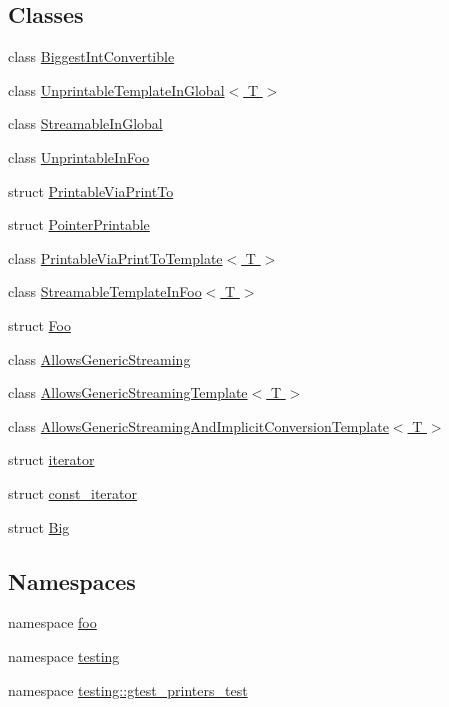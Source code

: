 \subsection*{\-Classes}
\begin{DoxyCompactItemize}
\item 
class \hyperlink{classBiggestIntConvertible}{\-Biggest\-Int\-Convertible}
\item 
class \hyperlink{classUnprintableTemplateInGlobal}{\-Unprintable\-Template\-In\-Global$<$ T $>$}
\item 
class \hyperlink{classStreamableInGlobal}{\-Streamable\-In\-Global}
\item 
class \hyperlink{classfoo_1_1UnprintableInFoo}{\-Unprintable\-In\-Foo}
\item 
struct \hyperlink{structfoo_1_1PrintableViaPrintTo}{\-Printable\-Via\-Print\-To}
\item 
struct \hyperlink{structfoo_1_1PointerPrintable}{\-Pointer\-Printable}
\item 
class \hyperlink{classfoo_1_1PrintableViaPrintToTemplate}{\-Printable\-Via\-Print\-To\-Template$<$ T $>$}
\item 
class \hyperlink{classfoo_1_1StreamableTemplateInFoo}{\-Streamable\-Template\-In\-Foo$<$ T $>$}
\item 
struct \hyperlink{structtesting_1_1gtest__printers__test_1_1Foo}{\-Foo}
\item 
class \hyperlink{classtesting_1_1gtest__printers__test_1_1AllowsGenericStreaming}{\-Allows\-Generic\-Streaming}
\item 
class \hyperlink{classtesting_1_1gtest__printers__test_1_1AllowsGenericStreamingTemplate}{\-Allows\-Generic\-Streaming\-Template$<$ T $>$}
\item 
class \hyperlink{classtesting_1_1gtest__printers__test_1_1AllowsGenericStreamingAndImplicitConversionTemplate}{\-Allows\-Generic\-Streaming\-And\-Implicit\-Conversion\-Template$<$ T $>$}
\item 
struct \hyperlink{structtesting_1_1gtest__printers__test_1_1iterator}{iterator}
\item 
struct \hyperlink{structtesting_1_1gtest__printers__test_1_1const__iterator}{const\-\_\-iterator}
\item 
struct \hyperlink{structtesting_1_1gtest__printers__test_1_1Big}{\-Big}
\end{DoxyCompactItemize}
\subsection*{\-Namespaces}
\begin{DoxyCompactItemize}
\item 
namespace \hyperlink{namespacefoo}{foo}
\item 
namespace \hyperlink{namespacetesting}{testing}
\item 
namespace \hyperlink{namespacetesting_1_1gtest__printers__test}{testing\-::gtest\-\_\-printers\-\_\-test}
\end{DoxyCompactItemize}
